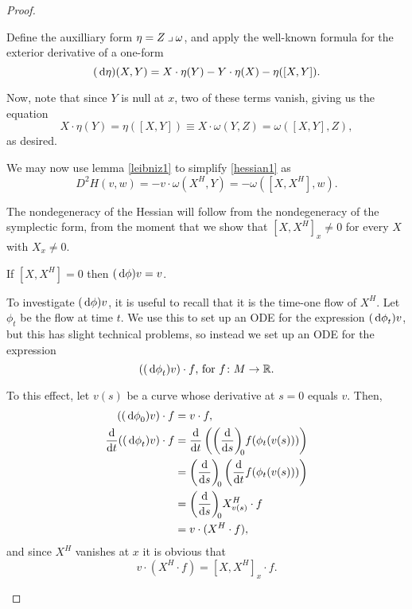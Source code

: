 \begin{proof}
\begin{lemmaproof}
Define the auxilliary form $\eta = Z \mathbin{\lrcorner} \omega$, and apply the well-known formula for the exterior derivative of a one-form
\begin{equation}
(\dl \eta)(X,Y) = X \cdot \eta(Y) - Y \cdot \eta(X) - \eta([X,Y]).
\end{equation}

Now, note that since $Y$ is null at $x$, two of these terms vanish, giving us the equation
\begin{equation}
X \cdot \eta(Y) = \eta([X,Y]) \equiv X \cdot \omega(Y,Z) = \omega([X,Y],Z),
\end{equation}
as desired.
\end{lemmaproof}

We may now use lemma \ref{leibniz1} to simplify \eqref{hessian1} as
\begin{equation}
D^2 H(v,w) = - v \cdot \omega(X^H, Y) = - \omega([X,X^H], w).
\end{equation}

The nondegeneracy of the Hessian will follow from the nondegeneracy of the symplectic form, from the moment that we show that $[X,X^H]_x \neq 0$ for every $X$ with $X_x \neq 0$.

\begin{lemma}\label{bracketnondegen}
If $[X,X^H] = 0$ then $(\dl \phi) v = v$.
\end{lemma}

\begin{lemmaproof}
To investigate $(\dl \phi) v$, it is useful to recall that it is the time-one flow of $X^H$. Let $\phi_t$ be the flow at time $t$. We use this to set up an ODE for the expression $(\dl \phi_t) v$, but this has slight technical problems, so instead we set up an ODE for the expression
\begin{equation}
((\dl \phi_t) v) \cdot f\text{, for $f \colon M \to \R$.}
\end{equation}

To this effect, let $v(s)$ be a curve whose derivative at $s=0$ equals $v$. Then,
\begin{equation}
\begin{split}
((\dl \phi_0) v) \cdot f &= v \cdot f,\\
\diff*{((\dl \phi_t) v) \cdot f}t &= \diff{}t \left( \diff{}s[0] f(\phi_t(v(s))) \right)\\
&= \diff{}s[0] \left( \diff{}t f(\phi_t(v(s)))\right)\\
&= \diff{}s[0] X^H_{v(s)} \cdot f\\
&= v \cdot (X^H \cdot f),
\end{split}
\end{equation}
and since $X^H$ vanishes at $x$ it is obvious that
\begin{equation}
v \cdot (X^H \cdot f) = [X,X^H]_x \cdot f.
\end{equation}


\end{lemmaproof}
\end{proof}
